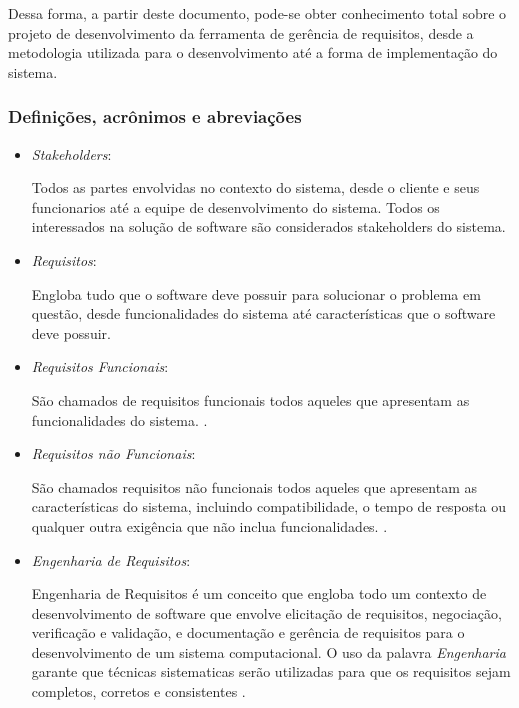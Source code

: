 Dessa forma, a partir deste documento, pode-se obter conhecimento total sobre o projeto de desenvolvimento da ferramenta de gerência de requisitos, desde a metodologia utilizada para o desenvolvimento até a forma de implementação do sistema.

\subsubsection{Definições, acrônimos e abreviações}

\begin{itemize}
	\item \textit{Stakeholders}:

		Todos as partes envolvidas no contexto do sistema, desde o cliente e seus funcionarios até a equipe de desenvolvimento do sistema. Todos os interessados na solução de software são considerados stakeholders do sistema.

	\item \textit{Requisitos}: 

		Engloba tudo que o software deve possuir para solucionar o problema em questão, desde funcionalidades do sistema até características que o software deve possuir.

	\item \textit{Requisitos Funcionais}:

		São chamados de requisitos funcionais todos aqueles que apresentam as funcionalidades do sistema. \cite{sommerville2003engenharia}.

	\item \textit{Requisitos não Funcionais}:

		São chamados requisitos não funcionais todos aqueles que apresentam as características do sistema, incluindo compatibilidade, o tempo de resposta ou qualquer outra exigência que não inclua funcionalidades. \cite{sommerville2003engenharia}.

	\item \textit{Engenharia de Requisitos}:

		Engenharia de Requisitos é um conceito que engloba todo um contexto de desenvolvimento de software que envolve elicitação de requisitos, negociação, verificação e validação, e documentação e gerência de requisitos para o desenvolvimento de um sistema computacional. O uso da palavra \textit{Engenharia} garante que técnicas sistematicas serão utilizadas para que os requisitos sejam completos, corretos e consistentes \cite{de2004analise}. 


\end{itemize}

